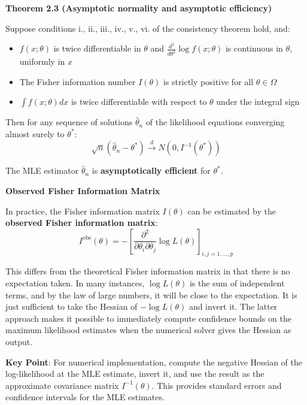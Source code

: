\documentclass[12pt,a4paper]{article}
\begin{document}
\vspace{0.5em}

\textbf{Theorem 2.3 (Asymptotic normality and asymptotic efficiency)}

Suppose conditions i., ii., iii., iv., v., vi. of the consistency theorem hold, and:
\begin{itemize}
    \item $f(x; \theta)$ is twice differentiable in $\theta$ and $\frac{d^2}{d\theta^2} \log f(x; \theta)$ is continuous in $\theta$, uniformly in $x$
    \item The Fisher information number $I(\theta)$ is strictly positive for all $\theta \in \Omega$
    \item $\int f(x; \theta) dx$ is twice differentiable with respect to $\theta$ under the integral sign
\end{itemize}

Then for any sequence of solutions $\hat{\theta}_n$ of the likelihood equations converging almost surely to $\theta^*$:
\[
\sqrt{n}(\hat{\theta}_n - \theta^*) \xrightarrow{d} N(0, I^{-1}(\theta^*))
\]

The MLE estimator $\hat{\theta}_n$ is \textbf{asymptotically efficient} for $\theta^*$.

\vspace{0.5em}

\textbf{Observed Fisher Information Matrix}

In practice, the Fisher information matrix $I(\theta)$ can be estimated by the \textbf{observed Fisher information matrix}:
\[
I^{\text{obs}}(\theta) = -\left[\frac{\partial^2}{\partial \theta_i \partial \theta_j} \log L(\theta)\right]_{i,j=1,\ldots,p}
\]

This differs from the theoretical Fisher information matrix in that there is no expectation taken. In many instances, $\log L(\theta)$ is the sum of independent terms, and by the law of large numbers, it will be close to the expectation. It is just sufficient to take the Hessian of $-\log L(\theta)$ and invert it. The latter approach makes it possible to immediately compute confidence bounds on the maximum likelihood estimates when the numerical solver gives the Hessian as output.

\textbf{Key Point}: For numerical implementation, compute the negative Hessian of the log-likelihood at the MLE estimate, invert it, and use the result as the approximate covariance matrix $I^{-1}(\theta)$. This provides standard errors and confidence intervals for the MLE estimates.
\end{document}
